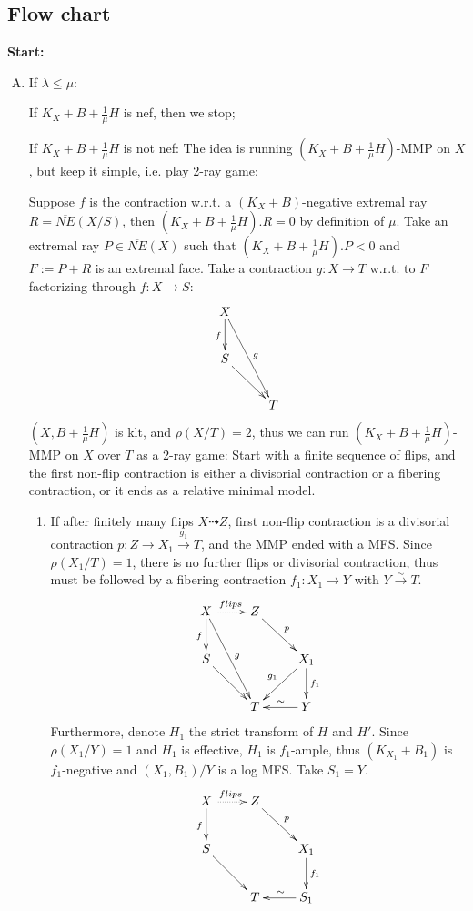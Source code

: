 \documentclass{article}
\begin{document}
\subsection{Flow chart}
\textbf{Start:}
\begin{enumerate}[(A)]
	\item If $ \lambda\leqslant\mu $:
	
	If $ K_X+B+\frac{1}{\mu}H $ is nef, then we stop;
	
	If $ K_X+B+\frac{1}{\mu}H $ is not nef: The idea is running $ (K_X+B+\frac{1}{\mu}H) $-MMP on $ X $, but keep it simple, i.e. play 2-ray game:
	
	Suppose $ f $ is the contraction w.r.t. a $ (K_X+B) $-negative extremal ray $ R= \overline{NE}(X/S) $, then $ (K_X+B+\frac{1}{\mu}H).R=0 $ by definition of $ \mu $.  Take an extremal ray $ P\in \overline{NE}(X) $ such that $ (K_X+B+\frac{1}{\mu}H).P<0 $ and $ F:=P+R $ is an extremal face. Take  a contraction $ g:X\to T $ w.r.t. to $ F $ factorizing through $ f:X\to S $: 
	$$ \xymatrix{
		X\ar[d]_f\ar[ddr]^g&\\
		S\ar[dr]&\\
		&T }$$
	$ (X,B+\frac{1}{\mu}H) $ is klt, and $ \rho(X/T)=2 $, thus we can  run $ (K_X+B+\frac{1}{\mu}H) $-MMP on $ X $ over $ T $ as a 2-ray game:  Start with a finite sequence of flips, and the first non-flip contraction is either a divisorial contraction or a fibering contraction, or it ends as a relative minimal model. 
	\begin{enumerate}[1)]
		\item If after finitely many flips $ X\dashrightarrow Z $, first non-flip contraction is a divisorial contraction $ p:Z\to X_1\xrightarrow{g_1}T $, and the MMP ended with a MFS.  Since $ \rho(X_1/T)=1 $, there is no further flips or divisorial contraction, thus must be followed by a fibering contraction $ f_1:X_1\to Y $ with $ Y\xrightarrow{\sim}T $.
		$$ \xymatrix{
			X\ar[d]_f\ar[ddr]^g\ar@{.>}[r]^{flips}&Z\ar[rd]^{p}&\\
			S\ar[dr]&&X_1\ar[d]^{f_1}\ar[ld]_{g_1}\\
			&T&Y\ar[l]_\sim}$$
		Furthermore, denote $ H_1 $ the strict transform of $ H $ and $ H' $. Since $ \rho(X_1/Y)=1 $ and $ H_1 $ is effective, $ H_1 $ is $ f_1 $-ample, thus $ (K_{X_1}+B_1) $ is $ f_1 $-negative and $ (X_1,B_1)/Y $ is a log MFS.  Take $ S_1=Y $.
		$$ \xymatrix{
			X\ar[d]_f\ar@{.>}[r]^{flips}&Z\ar[rd]^{p}&\\
			S\ar[dr]&&X_1\ar[d]^{f_1}\\
			&T&S_1\ar[l]_\sim}$$

\end{enumerate}
\end{enumerate}
\end{document}
